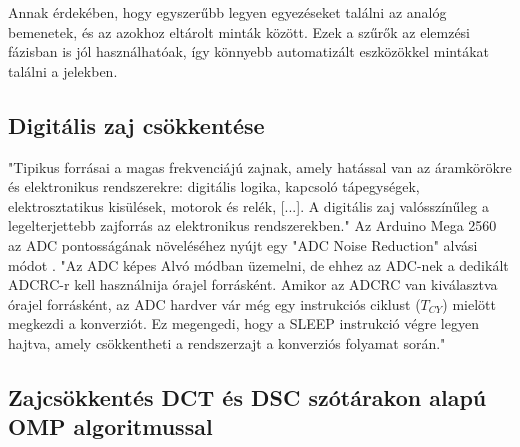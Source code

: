Annak érdekében, hogy egyszerűbb legyen egyezéseket találni az analóg bemenetek, és az azokhoz eltárolt minták között.
Ezek a szűrők az elemzési fázisban is jól használhatóak, így könnyebb automatizált eszközökkel mintákat találni a jelekben.

\subsection{Digitális zaj csökkentése}
"Tipikus forrásai a magas frekvenciájú zajnak, amely hatással van az áramkörökre és elektronikus rendszerekre: digitális logika, kapcsoló tápegységek, elektrosztatikus kisülések, motorok és relék, [...]. 
A digitális zaj valósszínűleg a legelterjettebb zajforrás az elektronikus rendszerekben."\cite{smith1992high}
Az Arduino Mega 2560 az ADC pontosságának növeléséhez nyújt egy "ADC Noise Reduction" alvási módot \cite{arduino_at_mega_datasheet}. 
"Az ADC képes Alvó módban üzemelni, de ehhez az ADC-nek a dedikált ADCRC-r kell használnija órajel forrásként. 
Amikor az ADCRC van kiválasztva órajel forrásként, az ADC hardver vár még egy instrukciós ciklust ($T_{CY}$) mielött megkezdi a konverziót. 
Ez megengedi, hogy a SLEEP instrukció végre legyen hajtva, amely csökkentheti a rendszerzajt a konverziós folyamat során."\cite{ATmega_processor_datasheet}

\subsection{Zajcsökkentés DCT és DSC szótárakon alapú OMP algoritmussal}
